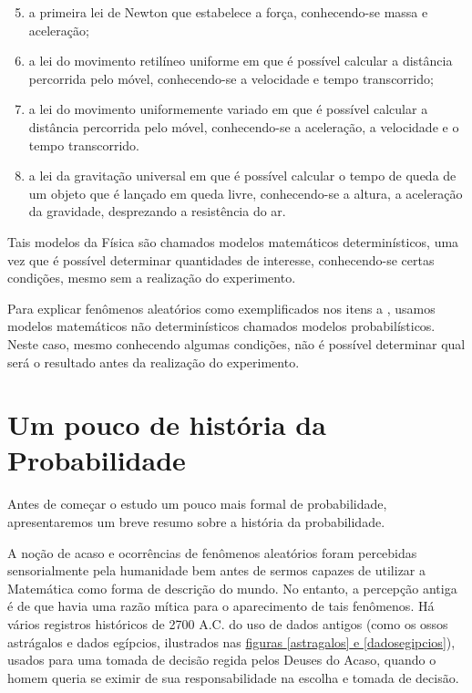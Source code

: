 \begin{enumerate}\setcounter{enumi}{4}
\item {} 
a primeira lei de Newton que estabelece a força, conhecendo-se massa e aceleração;

\item {} 
a lei do movimento retilíneo uniforme em que é possível calcular a distância percorrida pelo móvel, conhecendo-se a velocidade e tempo transcorrido;

\item {} 
a lei do movimento uniformemente variado em que é possível calcular a distância percorrida pelo móvel, conhecendo-se a aceleração, a velocidade e o tempo transcorrido.

\item {} 
a lei da gravitação universal em que é possível calcular o tempo de queda de um objeto que é lançado em queda livre, conhecendo-se a altura, a aceleração da gravidade, desprezando a resistência do ar.

\end{enumerate}

Tais modelos da Física são chamados modelos matemáticos determinísticos, uma vez que é possível determinar quantidades de interesse, conhecendo-se certas condições, mesmo sem a realização do experimento.

Para explicar fenômenos aleatórios como exemplificados nos itens  a , usamos modelos matemáticos não determinísticos chamados modelos probabilísticos. Neste caso, mesmo conhecendo algumas condições, não é possível determinar qual será o resultado antes da realização do experimento.

\section{Um pouco de história da Probabilidade}

Antes de começar o estudo um pouco mais formal de probabilidade, apresentaremos um breve resumo sobre a história da probabilidade.

A noção de acaso e ocorrências de fenômenos aleatórios foram percebidas   sensorialmente pela humanidade bem antes de sermos capazes de utilizar a Matemática como forma de descrição do mundo. No entanto, a percepção antiga é de que havia uma razão mítica para o aparecimento de tais fenômenos. Há vários registros históricos de 2700 A.C. do uso de dados antigos (como os ossos astrágalos e dados egípcios, ilustrados nas \hyperref[astragalos]{figuras \ref{astragalos} e \ref{dadosegipcios}}), usados para uma tomada de decisão regida pelos Deuses do Acaso, quando o homem queria se eximir de sua responsabilidade na escolha e tomada de decisão.

